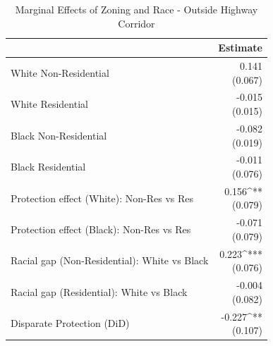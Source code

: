\begin{table}[h]
\centering
\caption{Marginal Effects of Zoning and Race - Outside Highway Corridor}
\label{tab:indirect_marginal_interaction}
\begin{tabular*}{0.7\textwidth}{@{\extracolsep{\fill}}l*{1}{r}}
\toprule
 & Estimate \\
\midrule
White Non-Residential & \makecell[tr]{0.141 \\ (0.067)} \\
White Residential & \makecell[tr]{-0.015 \\ (0.015)} \\
Black Non-Residential & \makecell[tr]{-0.082 \\ (0.019)} \\
Black Residential & \makecell[tr]{-0.011 \\ (0.076)} \\
Protection effect (White): Non-Res vs Res & \makecell[tr]{0.156^{**} \\ (0.079)} \\
Protection effect (Black): Non-Res vs Res & \makecell[tr]{-0.071 \\ (0.079)} \\
Racial gap (Non-Residential): White vs Black & \makecell[tr]{0.223^{***} \\ (0.076)} \\
Racial gap (Residential): White vs Black & \makecell[tr]{-0.004 \\ (0.082)} \\
Disparate Protection (DiD) & \makecell[tr]{-0.227^{**} \\ (0.107)} \\
\bottomrule
\end{tabular*}
\end{table}
